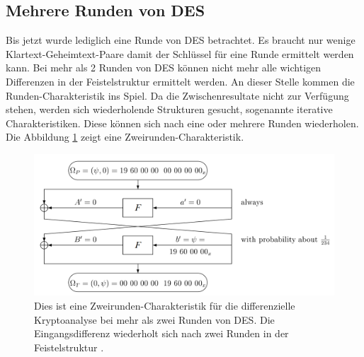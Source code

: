 \subsection{Mehrere Runden von DES}\label{subsec:Mehrere_Runden}
Bis jetzt wurde lediglich eine Runde von DES betrachtet. Es braucht nur wenige Klartext-Geheimtext-Paare damit der Schlüssel für eine Runde ermittelt werden kann. Bei mehr als 2 Runden von DES können nicht mehr alle wichtigen Differenzen in der Feistelstruktur ermittelt werden. 
An dieser Stelle kommen die Runden-Charakteristik ins Spiel. Da die Zwischenresultate nicht zur Verfügung stehen, werden sich wiederholende Strukturen gesucht, sogenannte iterative Charakteristiken. Diese können sich nach eine oder mehrere Runden wiederholen. Die Abbildung \ref{fig:Charakteristik} zeigt eine Zweirunden-Charakteristik. 

\begin{figure}[h]
	\centering
	\includegraphics[width=1.0\linewidth]{graphics/Charakteristik.png}
	\caption{Dies ist eine Zweirunden-Charakteristik für die differenzielle Kryptoanalyse bei mehr als zwei Runden von DES. Die Eingangsdifferenz wiederholt sich nach zwei Runden in der Feistelstruktur \cite{biham_differential_1990}.}
	\label{fig:Charakteristik}
\end{figure}

